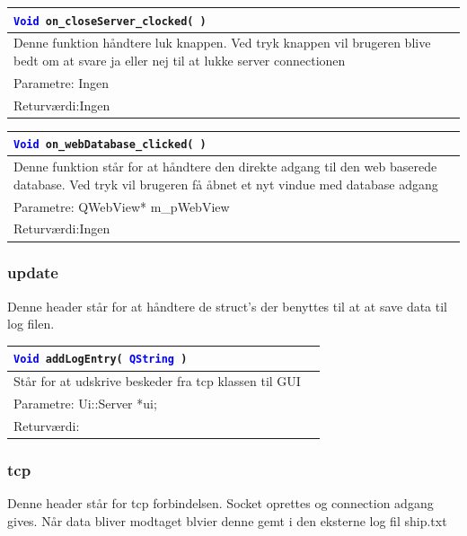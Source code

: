 \begin{table}[H]
\begin{tabular}{l p{12.5cm}}
\multicolumn{2}{l}{\texttt{\textcolor{blue}{Void} on\_closeServer\_clocked( )}} \\
\hline
Denne funktion håndtere luk knappen. Ved tryk knappen vil brugeren blive bedt om at svare ja eller nej til at lukke server connectionen \\
Parametre: Ingen\\
Returværdi:Ingen\\
\end{tabular}
\end{table}

\begin{table}[H]
\begin{tabular}{l p{12.5cm}}
\multicolumn{2}{l}{\texttt{\textcolor{blue}{Void} on\_webDatabase\_clicked( )}} \\
\hline
Denne funktion står for at håndtere den direkte adgang til den web baserede database. Ved tryk vil brugeren få åbnet et nyt vindue med database adgang \\
Parametre: QWebView* m\_pWebView\\
Returværdi:Ingen\\
\end{tabular}
\end{table}

\subsubsection{update}
Denne header står for at håndtere de struct's der benyttes til at at save data til log filen. 

\begin{table}[H]
\begin{tabular}{l p{12.5cm}}
\multicolumn{2}{l}{\texttt{\textcolor{blue}{Void} addLogEntry( \textcolor{blue}{QString} )}} \\
\hline
Står for at udskrive beskeder fra tcp klassen til GUI \\
Parametre: Ui::Server *ui;\\
Returværdi:&\\
\end{tabular}
\end{table}


\subsubsection{tcp}
Denne header står for tcp forbindelsen. Socket oprettes og connection adgang gives. Når data bliver modtaget blvier denne gemt i den eksterne log fil ship.txt


